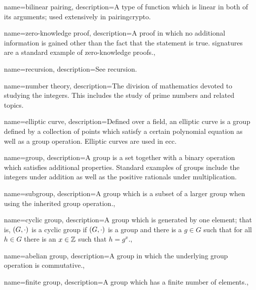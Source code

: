 {
    name={bilinear pairing},
    description={A type of \gls{function} which is linear
        in both of its arguments;
        used extensively in \gls{pairingcrypto}.}
}

{
    name={zero-knowledge proof},
    description={A proof in which no additional information
        is gained other than the fact that the statement is true.
        \Glspl{signature} are a standard example of zero-knowledge
        proofs.},
}

{
    name={recursion},
    description={See \gls{recursion}.}
}


{
    name={number theory},
    description={The division of mathematics devoted to studying
        the integers.
        This includes the study of prime numbers and related topics.}
}

{
    name={elliptic curve},
    description={Defined over a \gls{field}, an elliptic curve is a \gls{group}
        defined by a collection of points which satisfy a certain polynomial
        equation as well as a group operation.
        Elliptic curves are used in \gls{ecc}.}
}

{
    name={group},
    description={A group is a \gls{set} together with a binary operation
        which satisfies additional properties.
        Standard examples of groups include the integers under addition
        as well as the positive rationals under multiplication.}
}

{
    name={subgroup},
    description={A \gls{group} which is a subset of a larger group
        when using the inherited group operation.},
}

{
    name={cyclic group},
    description={A \gls{group} which is generated by one element;
        that is, $\left( G,\cdot \right)$ is a cyclic group if
        $\left( G,\cdot \right)$ is a \gls{group} and there is a $g\in G$
        such that for all $h\in G$ there is an $x\in\mathbb{Z}$ such that
        $h=g^{x}$.},
}

{
    name={abelian group},
    description={A \gls{group} in which the underlying group operation
        is \gls{commutative}.},
}

{
    name={finite group},
    description={A \gls{group} which has a finite number of elements.},
}

